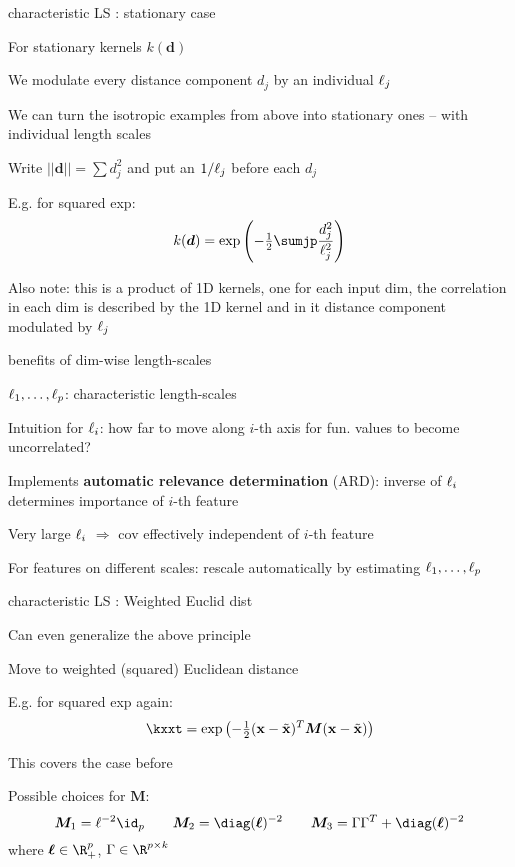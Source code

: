 \documentclass[11pt,compress,t,notes=noshow, xcolor=table]{beamer}
\begin{document}
\begin{framei}[sep=M]{characteristic LS : stationary case}
\item For stationary kernels $k(\bm{d})$ 
\item We modulate every distance component $d_j$ by an individual $\ell_j$
\item We can turn the isotropic examples from above into 
stationary ones -- with individual length scales
\item Write $||\bm{d}|| = \sum d_j^2$ and put an $1/\ell_j$ before each $d_j$
\item E.g. for squared exp:
$$
  k(\bm{d}) = \exp \left(- \tfrac{1}{2} \sumjp \frac{d_j^2}{\ell_j^2} \right)
$$
\item Also note: this is a product of 1D kernels, one for each input dim, the correlation in each dim is described by the 1D kernel and in it distance component modulated by $\ell_j$
\end{framei}


\begin{framei}[sep=L]{benefits of dim-wise length-scales}
\item $\ell_1,\dots, \ell_p$: characteristic length-scales
\item Intuition for $\ell_i$: how far to move along $i$-th axis for fun. values to become uncorrelated?
\item Implements \textbf{automatic relevance determination} (ARD): inverse of $\ell_i$ determines importance of $i$-th feature
\item Very large $\ell_i$ $\Rightarrow$ cov effectively independent of $i$-th feature
\item For features on different scales: rescale automatically by estimating $\ell_1,\dots, \ell_p$ 
\end{framei}



\begin{framei}[sep=M]{characteristic LS : Weighted Euclid dist}

\item Can even generalize the above principle
\item Move to weighted (squared) Euclidean distance
\item E.g. for squared exp again: 
$$
\kxxt = \exp \left(- \tfrac{1}{2}(\xv - \xtil)^T\bm{M} (\xv - \xtil )\right)
$$
\item This covers the case before
\item Possible choices for $\bm{M}$:
$$
\bm{M}_1 = \ls^{-2}\id_p \qquad \bm{M}_2 = \diag(\bm{\ls})^{-2} \qquad \bm{M}_3 = \Gamma \Gamma^T + \diag(\bm{\ls})^{-2}
$$
where $\bm{\ls} \in \R^p_+$, $\Gamma \in \R^{p \times k}$ 
\end{framei}
\end{document}
